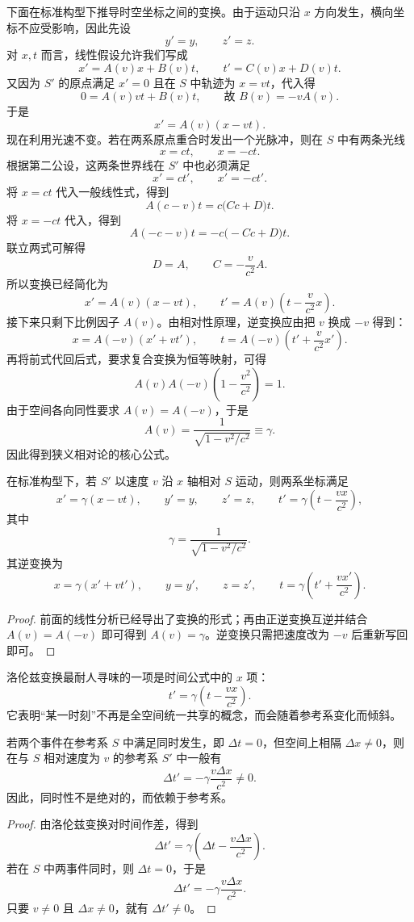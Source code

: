 下面在标准构型下推导时空坐标之间的变换。由于运动只沿 $x$ 方向发生，横向坐标不应受影响，因此先设
\[
y'=y,\qquad z'=z.
\]
对 $x,t$ 而言，线性假设允许我们写成
\[
x'=A(v)x+B(v)t,
\qquad
 t'=C(v)x+D(v)t.
\]
又因为 $S'$ 的原点满足 $x'=0$ 且在 $S$ 中轨迹为 $x=vt$，代入得
\[
0=A(v)vt+B(v)t,
\qquad \text{故 } B(v)=-vA(v).
\]
于是
\[
x'=A(v)(x-vt).
\]
现在利用光速不变。若在两系原点重合时发出一个光脉冲，则在 $S$ 中有两条光线
\[
x=ct,\qquad x=-ct.
\]
根据第二公设，这两条世界线在 $S'$ 中也必须满足
\[
x'=ct',\qquad x'=-ct'.
\]
将 $x=ct$ 代入一般线性式，得到
\[
A(c-v)t=c\bigl(Cc+D\bigr)t.
\]
将 $x=-ct$ 代入，得到
\[
A(-c-v)t=-c\bigl(-Cc+D\bigr)t.
\]
联立两式可解得
\[
D=A,
\qquad
C=-\frac{v}{c^2}A.
\]
所以变换已经简化为
\[
x'=A(v)(x-vt),
\qquad
t'=A(v)\left(t-\frac{v}{c^2}x\right).
\]
接下来只剩下比例因子 $A(v)$。由相对性原理，逆变换应由把 $v$ 换成 $-v$ 得到：
\[
x=A(-v)(x'+vt'),
\qquad
t=A(-v)\left(t'+\frac{v}{c^2}x'\right).
\]
再将前式代回后式，要求复合变换为恒等映射，可得
\[
A(v)A(-v)\left(1-\frac{v^2}{c^2}\right)=1.
\]
由于空间各向同性要求 $A(v)=A(-v)$，于是
\[
A(v)=\frac{1}{\sqrt{1-v^2/c^2}}\equiv \gamma.
\]
因此得到狭义相对论的核心公式。

\begin{theorem}[洛伦兹变换]
在标准构型下，若 $S'$ 以速度 $v$ 沿 $x$ 轴相对 $S$ 运动，则两系坐标满足
\[
x'=\gamma(x-vt),
\qquad
y'=y,
\qquad
z'=z,
\qquad
t'=\gamma\left(t-\frac{vx}{c^2}\right),
\]
其中
\[
\gamma=\frac{1}{\sqrt{1-v^2/c^2}}.
\]
其逆变换为
\[
x=\gamma(x'+vt'),
\qquad
y=y',
\qquad
z=z',
\qquad
t=\gamma\left(t'+\frac{vx'}{c^2}\right).
\]
\end{theorem}

\begin{proof}
前面的线性分析已经导出了变换的形式；再由正逆变换互逆并结合 $A(v)=A(-v)$ 即可得到 $A(v)=\gamma$。逆变换只需把速度改为 $-v$ 后重新写回即可。
\end{proof}

洛伦兹变换最耐人寻味的一项是时间公式中的 $x$ 项：
\[
 t'=\gamma\left(t-\frac{vx}{c^2}\right).
\]
它表明“某一时刻”不再是全空间统一共享的概念，而会随着参考系变化而倾斜。

\begin{theorem}[同时性的相对性]
若两个事件在参考系 $S$ 中满足同时发生，即 $\Delta t=0$，但空间上相隔 $\Delta x\neq 0$，则在与 $S$ 相对速度为 $v$ 的参考系 $S'$ 中一般有
\[
\Delta t'=-\gamma\frac{v\Delta x}{c^2}\neq 0.
\]
因此，同时性不是绝对的，而依赖于参考系。
\end{theorem}

\begin{proof}
由洛伦兹变换对时间作差，得到
\[
\Delta t'=\gamma\left(\Delta t-\frac{v\Delta x}{c^2}\right).
\]
若在 $S$ 中两事件同时，则 $\Delta t=0$，于是
\[
\Delta t'=-\gamma\frac{v\Delta x}{c^2}.
\]
只要 $v\neq 0$ 且 $\Delta x\neq 0$，就有 $\Delta t'\neq 0$。
\end{proof}

